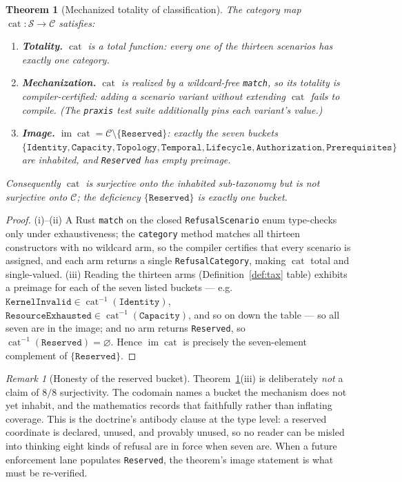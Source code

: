 \documentclass[11pt,oneside]{book}
\theoremstyle{definition}
\theoremstyle{plain}
\newtheorem{theorem}{Theorem}[chapter]
\theoremstyle{remark}
\newtheorem*{remark}{Remark}
\DeclareMathOperator{\im}{im}
\newcommand{\code}[1]{\texttt{#1}}
\newcommand{\Catset}{\mathcal{C}}              %
\newcommand{\Scnset}{\mathcal{S}}              %
\DeclareMathOperator{\catop}{cat}
\begin{document}
\begin{theorem}[Mechanized totality of classification]\label{thm:total}
The category map $\catop:\Scnset\to\Catset$ satisfies:
\begin{enumerate}[label=(\roman*),leftmargin=*]
\item \textbf{Totality.} $\catop$ is a total function: every one of the thirteen scenarios has
exactly one category.
\item \textbf{Mechanization.} $\catop$ is realized by a wildcard-free \code{match}, so its
totality is compiler-certified: adding a scenario variant without extending $\catop$ fails to
compile. (The \code{praxis} test suite additionally pins each variant's value.)
\item \textbf{Image.} $\im\catop=\Catset\setminus\{\code{Reserved}\}$: exactly the seven
buckets $\{\code{Identity},\code{Capacity},\code{Topology},\code{Temporal},\code{Lifecycle},
\code{Authorization},\code{Prerequisites}\}$ are inhabited, and \code{Reserved} has empty
preimage.
\end{enumerate}
Consequently $\catop$ is surjective onto the inhabited sub-taxonomy but is \emph{not}
surjective onto $\Catset$; the deficiency $\{\code{Reserved}\}$ is exactly one bucket.
\end{theorem}

\begin{proof}
(i)--(ii) A Rust \code{match} on the closed \code{RefusalScenario} enum type-checks only under
exhaustiveness; the \code{category} method matches all thirteen constructors with no wildcard
arm, so the compiler certifies that every scenario is assigned, and each arm returns a single
\code{RefusalCategory}, making $\catop$ total and single-valued. (iii) Reading the thirteen
arms (Definition~\ref{def:tax} table) exhibits a preimage for each of the seven listed buckets
--- e.g.\ $\code{KernelInvalid}\in\catop^{-1}(\code{Identity})$,
$\code{ResourceExhausted}\in\catop^{-1}(\code{Capacity})$, and so on down the table --- so all
seven are in the image; and no arm returns \code{Reserved}, so $\catop^{-1}(\code{Reserved})
=\varnothing$. Hence $\im\catop$ is precisely the seven-element complement of
$\{\code{Reserved}\}$. \end{proof}

\begin{remark}[Honesty of the reserved bucket]
Theorem~\ref{thm:total}(iii) is deliberately \emph{not} a claim of $8/8$ surjectivity. The
codomain names a bucket the mechanism does not yet inhabit, and the mathematics records that
faithfully rather than inflating coverage. This is the doctrine's antibody clause at the type
level: a reserved coordinate is declared, unused, and provably unused, so no reader can be
misled into thinking eight kinds of refusal are in force when seven are. When a future
enforcement lane populates \code{Reserved}, the theorem's image statement is what must be
re-verified.
\end{remark}
\end{document}
